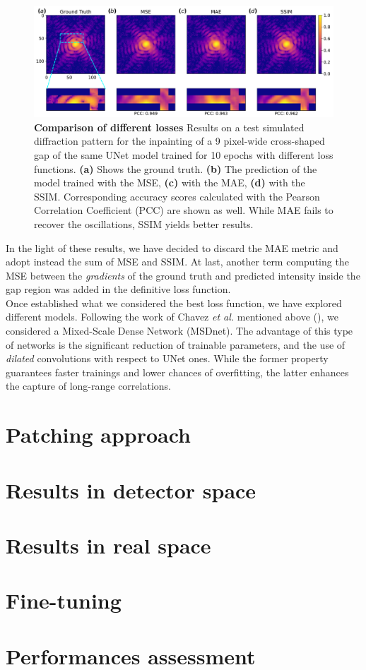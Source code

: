 \begin{figure}[h]
    \includegraphics[width=\textwidth]{figures/Inpainting/loss_comparison.pdf}
    \caption{\textbf{Comparison of different losses} Results on a test simulated diffraction pattern for the inpainting 
    of a 9 pixel-wide cross-shaped gap of the same UNet model trained for 10 epochs with different loss functions. 
    \textbf{(a)} Shows the ground truth. \textbf{(b)} The prediction of the model trained with the MSE, \textbf{(c)} 
    with the MAE, \textbf{(d)} with the SSIM. Corresponding accuracy scores calculated with the Pearson Correlation 
    Coefficient (PCC) are shown as well. While MAE fails to recover the oscillations, SSIM yields better results.}
    \label{fig:loss_comparison}
\end{figure}

In the light of these results, we have decided to discard the MAE metric and adopt instead the sum of MSE and SSIM. 
At last, another term computing the MSE between the \textit{gradients} of the ground truth and predicted intensity inside
the gap region was added in the definitive loss function.\\

Once established what we considered the best loss function, we have explored different models. 
Following the work of Chavez \textit{et al.} mentioned above (\cite{chavez_comparison_2022}), we considered a 
Mixed-Scale Dense Network (MSDnet). The advantage of this type of networks is the significant reduction of trainable
parameters, and the use of \textit{dilated} convolutions with respect to UNet ones. While the former property guarantees
faster trainings and lower chances of overfitting, the latter enhances the capture of long-range correlations. 

\section{Patching approach}\label{sec:patching}

\section{Results in detector space}\label{sec:res_rec}
\section{Results in real space}\label{sec:res_real}
\section{Fine-tuning}\label{sec:finetuning}
\section{Performances assessment}\label{sec:performances}
